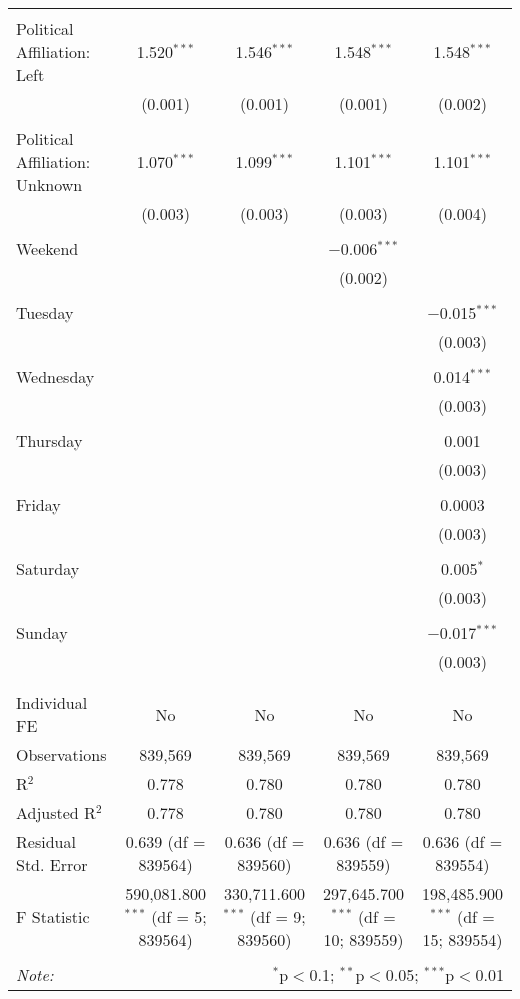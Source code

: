 \documentclass[
]{article}
\begin{document}
\begin{table}[!htbp]
{\begin{tabular}{@{\extracolsep{5pt}}lcccc}
  & & & & \\ 
 Political Affiliation: Left & 1.520$^{***}$ & 1.546$^{***}$ & 1.548$^{***}$ & 1.548$^{***}$ \\ 
  & (0.001) & (0.001) & (0.001) & (0.002) \\ 
  & & & & \\ 
 Political Affiliation: Unknown & 1.070$^{***}$ & 1.099$^{***}$ & 1.101$^{***}$ & 1.101$^{***}$ \\ 
  & (0.003) & (0.003) & (0.003) & (0.004) \\ 
  & & & & \\ 
 Weekend &  &  & $-$0.006$^{***}$ &  \\ 
  &  &  & (0.002) &  \\ 
  & & & & \\ 
 Tuesday &  &  &  & $-$0.015$^{***}$ \\ 
  &  &  &  & (0.003) \\ 
  & & & & \\ 
 Wednesday &  &  &  & 0.014$^{***}$ \\ 
  &  &  &  & (0.003) \\ 
  & & & & \\ 
 Thursday &  &  &  & 0.001 \\ 
  &  &  &  & (0.003) \\ 
  & & & & \\ 
 Friday &  &  &  & 0.0003 \\ 
  &  &  &  & (0.003) \\ 
  & & & & \\ 
 Saturday &  &  &  & 0.005$^{*}$ \\ 
  &  &  &  & (0.003) \\ 
  & & & & \\ 
 Sunday &  &  &  & $-$0.017$^{***}$ \\ 
  &  &  &  & (0.003) \\ 
  & & & & \\ 
\hline \\[-1.8ex] 
Individual FE & No & No & No & No \\ 
Observations & 839,569 & 839,569 & 839,569 & 839,569 \\ 
R$^{2}$ & 0.778 & 0.780 & 0.780 & 0.780 \\ 
Adjusted R$^{2}$ & 0.778 & 0.780 & 0.780 & 0.780 \\ 
Residual Std. Error & 0.639 (df = 839564) & 0.636 (df = 839560) & 0.636 (df = 839559) & 0.636 (df = 839554) \\ 
F Statistic & 590,081.800$^{***}$ (df = 5; 839564) & 330,711.600$^{***}$ (df = 9; 839560) & 297,645.700$^{***}$ (df = 10; 839559) & 198,485.900$^{***}$ (df = 15; 839554) \\ 
\hline 
\hline \\[-1.8ex] 
\textit{Note:}  & \multicolumn{4}{r}{$^{*}$p$<$0.1; $^{**}$p$<$0.05; $^{***}$p$<$0.01} \\ 
\end{tabular}
} 
\end{table} 
\newpage
\end{document}
